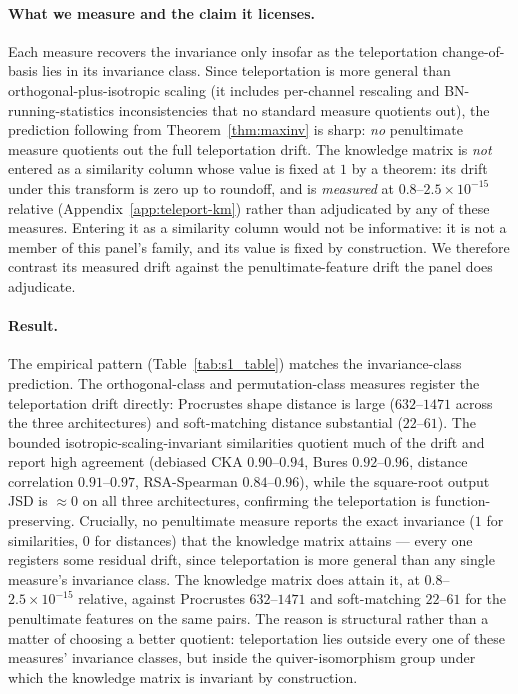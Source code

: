 \paragraph{What we measure and the claim it licenses.}
Each measure recovers the invariance only insofar as the teleportation
change-of-basis lies in its invariance class. Since teleportation is more
general than orthogonal-plus-isotropic scaling (it includes per-channel
rescaling and BN-running-statistics inconsistencies that no standard
measure quotients out), the prediction following from
Theorem~\ref{thm:maxinv} is sharp: \emph{no} penultimate measure quotients
out the full teleportation drift. The knowledge matrix is \emph{not}
entered as a similarity column whose value is fixed at $1$ by a theorem:
its drift under this transform is zero up to roundoff, and is
\emph{measured} at $0.8$--$2.5\times10^{-15}$ relative
(Appendix~\ref{app:teleport-km}) rather than adjudicated by any of these
measures. Entering it as a similarity column would not be informative: it is not
a member of this panel's family, and its value is fixed by construction. We
therefore contrast its measured drift against the penultimate-feature drift the
panel does adjudicate.

\paragraph{Result.}


The empirical pattern (Table~\ref{tab:s1_table}) matches the
invariance-class prediction. The orthogonal-class and permutation-class
measures register the teleportation drift directly: Procrustes shape
distance is large ($632$--$1471$ across the three architectures) and
soft-matching distance substantial ($22$--$61$). The bounded
isotropic-scaling-invariant similarities quotient much of the drift and
report high agreement (debiased CKA $0.90$--$0.94$, Bures $0.92$--$0.96$,
distance correlation $0.91$--$0.97$, RSA-Spearman $0.84$--$0.96$), while
the square-root output JSD is $\approx 0$ on all three architectures,
confirming the teleportation is function-preserving. Crucially, no
penultimate measure reports the exact invariance ($1$ for similarities,
$0$ for distances) that the knowledge matrix attains --- every one registers some
residual drift, since teleportation is more general than any single measure's
invariance class. The knowledge matrix does attain it, at
$0.8$--$2.5\times10^{-15}$ relative, against Procrustes $632$--$1471$ and
soft-matching $22$--$61$ for the penultimate features on the same pairs. The
reason is structural rather than a matter of choosing a better quotient:
teleportation lies outside every one of these measures' invariance classes, but
inside the quiver-isomorphism group under which the knowledge matrix is invariant
by construction.

